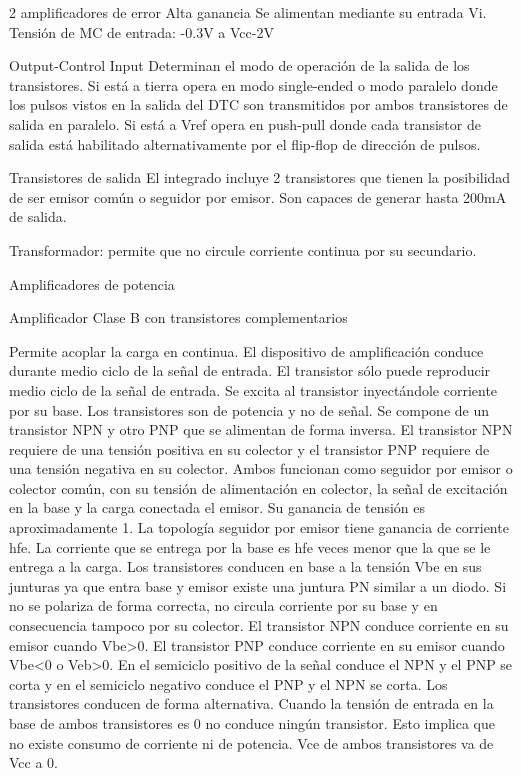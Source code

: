 2 amplificadores de error 
Alta ganancia
Se alimentan mediante su entrada Vi. 
Tensión de MC de entrada: -0.3V a Vcc-2V

Output-Control Input
Determinan el modo de operación de la salida de los transistores. 
Si está a tierra opera en modo single-ended o modo paralelo donde los pulsos vistos en la salida del DTC son transmitidos por ambos transistores de salida en paralelo.
Si está a Vref opera en push-pull donde cada transistor de salida está habilitado alternativamente por el flip-flop de dirección de pulsos.

Transistores de salida
El integrado incluye 2 transistores que tienen la posibilidad de ser emisor común o seguidor por emisor. 
Son capaces de generar hasta 200mA de salida. 


Transformador: permite que no circule corriente continua por su secundario. 

Amplificadores de potencia

Amplificador Clase B con transistores complementarios

Permite acoplar la carga en continua. 
El dispositivo de amplificación conduce durante medio ciclo de la señal de entrada. 
El transistor sólo puede reproducir medio ciclo de la señal de entrada. 
Se excita al transistor inyectándole corriente por su base.
Los transistores son de potencia y no de señal. 
Se compone de un transistor NPN y otro PNP que se alimentan de forma inversa.
El transistor NPN requiere de una tensión positiva en su colector y 
el transistor PNP requiere de una tensión negativa en su colector.
Ambos funcionan como seguidor por emisor o colector común, con su tensión de alimentación en colector, la señal de excitación en la base y la carga conectada el emisor. 
Su ganancia de tensión es aproximadamente 1. 
La topología seguidor por emisor tiene ganancia de corriente hfe. 
La corriente que se entrega por la base es hfe veces menor que la que se le entrega a la carga. 
Los transistores conducen en base a la tensión Vbe en sus junturas ya que entra base y emisor existe una juntura PN similar a un diodo. 
Si no se polariza de forma correcta, no circula corriente por su base y en consecuencia tampoco por su colector. 
El transistor NPN conduce corriente en su emisor cuando Vbe>0. 
El transistor PNP conduce corriente en su emisor cuando Vbe<0 o Veb>0.
En el semiciclo positivo de la señal conduce el NPN y el PNP se corta y en el semiciclo negativo conduce el PNP y el NPN se corta. 
Los transistores conducen de forma alternativa. 
Cuando la tensión de entrada en la base de ambos transistores es 0 no conduce ningún transistor. 
Esto implica que no existe consumo de corriente ni de potencia. 
Vce de ambos transistores va de Vcc a 0.

